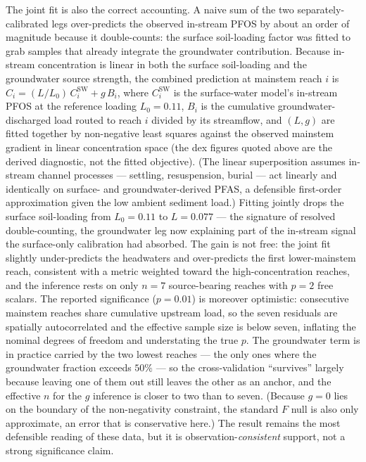 The joint fit is also the correct accounting. A naive sum of the two separately-calibrated legs
over-predicts the observed in-stream PFOS by about an order of magnitude because it double-counts: the
surface soil-loading factor was fitted to grab samples that already integrate the groundwater
contribution. Because in-stream concentration is linear in both the surface soil-loading and the
groundwater source strength, the combined prediction at mainstem reach $i$ is
$C_i = (L/L_0)\,C^{\mathrm{SW}}_i + g\,B_i$, where $C^{\mathrm{SW}}_i$ is the surface-water model's
in-stream PFOS at the reference loading $L_0=0.11$, $B_i$ is the cumulative groundwater-discharged
load routed to reach $i$ divided by its streamflow, and $(L,g)$ are fitted together by non-negative
least squares against the observed mainstem gradient in linear concentration space (the dex figures
quoted above are the derived diagnostic, not the fitted objective). (The linear superposition assumes in-stream
channel processes --- settling, resuspension, burial --- act linearly and identically on surface- and
groundwater-derived PFAS, a defensible first-order approximation given the low ambient sediment load.)
Fitting jointly drops the surface soil-loading from $L_0=0.11$ to $L=0.077$ --- the signature of
resolved double-counting, the groundwater leg now explaining part of the in-stream signal the
surface-only calibration had absorbed. The gain is not free: the joint fit slightly under-predicts the
headwaters and over-predicts the first lower-mainstem reach, consistent with a metric weighted toward
the high-concentration reaches, and the inference rests on only $n=7$ source-bearing reaches with $p=2$
free scalars. The reported significance ($p=0.01$) is moreover optimistic: consecutive mainstem reaches
share cumulative upstream load, so the seven residuals are spatially autocorrelated and the effective
sample size is below seven, inflating the nominal degrees of freedom and understating the true $p$. The
groundwater term is in practice carried by the two lowest reaches --- the only ones where the
groundwater fraction exceeds $50\%$ --- so the cross-validation ``survives'' largely because leaving one
of them out still leaves the other as an anchor, and the effective $n$ for the $g$ inference is closer to
two than to seven. (Because $g=0$ lies on the boundary of the non-negativity constraint, the standard
$F$ null is also only approximate, an error that is conservative here.) The result remains the most
defensible reading of these data, but it is observation-\emph{consistent} support, not a strong
significance claim.

